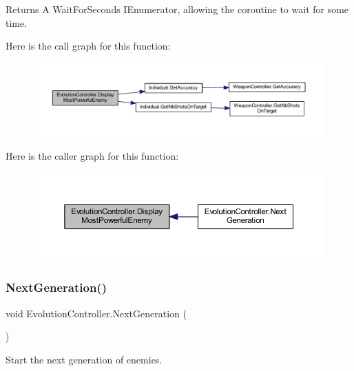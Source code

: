 \begin{DoxyReturn}{Returns}
A Wait\+For\+Seconds I\+Enumerator, allowing the coroutine to wait for some time.
\end{DoxyReturn}
Here is the call graph for this function\+:\nopagebreak
\begin{figure}[H]
\begin{center}
\leavevmode
\includegraphics[width=350pt]{class_evolution_controller_a56b57730a8b4707ffe1c8b8053871a84_cgraph}
\end{center}
\end{figure}
Here is the caller graph for this function\+:\nopagebreak
\begin{figure}[H]
\begin{center}
\leavevmode
\includegraphics[width=350pt]{class_evolution_controller_a56b57730a8b4707ffe1c8b8053871a84_icgraph}
\end{center}
\end{figure}
\mbox{\label{class_evolution_controller_ac65df1af1e9cdf179606f205e8f046f0}} 
\subsubsection{\texorpdfstring{Next\+Generation()}{NextGeneration()}}
{\footnotesize\ttfamily void Evolution\+Controller.\+Next\+Generation (\begin{DoxyParamCaption}{ }\end{DoxyParamCaption})}



Start the next generation of enemies. 

